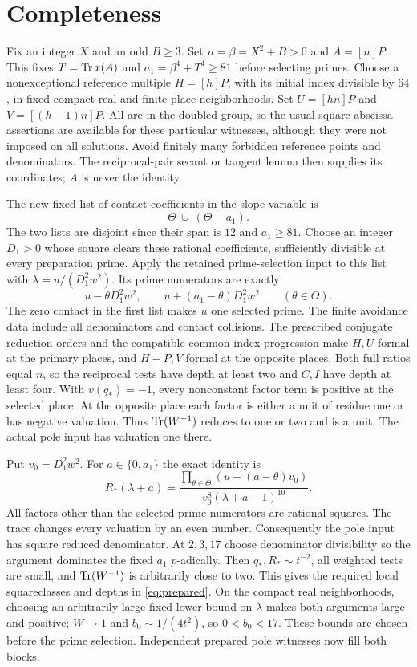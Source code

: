 \documentclass[11pt,a4paper]{article}
\begin{document}
\section{Completeness}\label{sec:complete}
Fix an integer $X$ and an odd $B\ge3$. Set $n=\beta=X^2+B>0$ and
$A=[n]P$. This fixes $T=\operatorname{Tr} x(A)$ and $a_1=\beta^4+T^4\ge81$
before selecting primes. Choose a nonexceptional reference multiple
$H=[h]P$, with its initial index divisible by $64$, in fixed compact
real and finite-place neighborhoods. Set $U=[hn]P$ and
$V=[(h-1)n]P$. All are in the doubled group, so the usual
square-abscissa assertions are available for these particular
witnesses, although they were not imposed on all solutions.
Avoid finitely many forbidden reference points and denominators.
The reciprocal-pair secant or tangent lemma then supplies its
coordinates; $A$ is never the identity.

The new fixed list of contact coefficients in the slope variable is
\[
                    \Theta\ \cup\ (\Theta-a_1).
\]
The two lists are disjoint since their span is $12$ and $a_1\ge81$.
Choose an integer $D_1>0$ whose square clears these rational
coefficients, sufficiently divisible at every preparation prime.
Apply the retained prime-selection input to this list with
$\lambda=u/(D_1^2w^2)$. Its prime numerators are exactly
\[
 u-\theta D_1^2w^2,\qquad
 u+(a_1-\theta)D_1^2w^2\qquad(\theta\in\Theta).
\]
The zero contact in the first list makes $u$ one selected prime.
The finite avoidance data include all denominators and contact
collisions. The prescribed conjugate reduction orders and the
compatible common-index progression make $H,U$ formal at the
primary places, and $H-P,V$ formal at the opposite places. Both
full ratios equal $n$, so the reciprocal tests have depth at least
two and $C,I$ have depth at least four. With $v(q_*)=-1$, every
nonconstant factor term is positive at the selected place. At the
opposite place each factor is either a unit of residue one or has
negative valuation. Thus $\operatorname{Tr}(W^{-1})$ reduces to one or two and is
a unit. The actual pole input has valuation one there.

Put $v_0=D_1^2w^2$. For $a\in\{0,a_1\}$ the exact identity is
\[
 R_*(\lambda+a)=
 \frac{\prod_{\theta\in\Theta}(u+(a-\theta)v_0)}
 {v_0^8(\lambda+a-1)^{10}}.
\]
All factors other than the selected prime numerators are rational
squares. The trace changes every valuation by an even number.
Consequently the pole input has square reduced denominator.
At $2,3,17$ choose denominator divisibility so the argument dominates
the fixed $a_1$ $p$-adically. Then $q_*,R_*\sim t^{-2}$, all weighted
tests are small, and $\operatorname{Tr}(W^{-1})$ is arbitrarily close to two.
This gives the required local squareclasses and depths in
\eqref{eq:prepared}. On the compact real neighborhoods, choosing an
arbitrarily large fixed lower bound on $\lambda$ makes both arguments
large and positive; $W\to1$ and $b_0\sim1/(4t^2)$, so
$0<b_0<17$. These bounds are chosen before the prime selection.
Independent prepared pole witnesses now fill both blocks.
\end{document}
